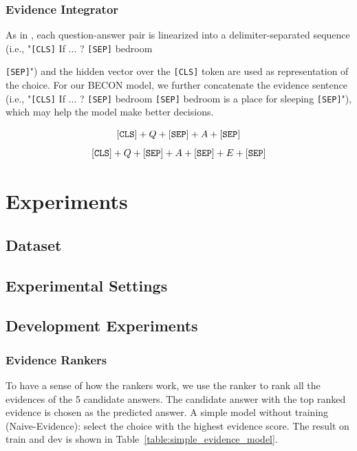 \documentclass[letterpaper]{article} %
\begin{document}
\subsubsection{Evidence Integrator}

As in \cite{talmor2018commonsenseqa}, each question-answer pair is linearized into a delimiter-separated sequence (i.e., "{\tt[CLS]} If ... ? {\tt [SEP]} bedroom {{\tt [SEP]}") and the hidden vector over the {\tt [CLS]} token are used as representation of the choice. For our BECON model, we further concatenate the evidence sentence (i.e., "{\tt [CLS]} If ... ? {\tt [SEP]} bedroom {\tt [SEP]} bedroom is a place for sleeping {\tt [SEP]}"), which may help the model make better decisions.

$${\tt [CLS]} + Q + {\tt [SEP]} + A + {\tt [SEP]}$$
$${\tt [CLS]} + Q + {\tt [SEP]} + A + {\tt [SEP]} + E + {\tt [SEP]}$$

\section{Experiments}

\subsection{Dataset}

\subsection{Experimental Settings}

\subsection{Development Experiments}

\subsubsection{Evidence Rankers}

To have a sense of how the rankers work, we use the ranker to rank all the evidences of the 5 candidate answers. The candidate answer with the top ranked evidence is chosen as the predicted answer. A simple model without training (Naive-Evidence): select the choice with the highest evidence score. The result on train and dev is shown in Table~\ref{table:simple_evidence_model}.

}
\end{document}
